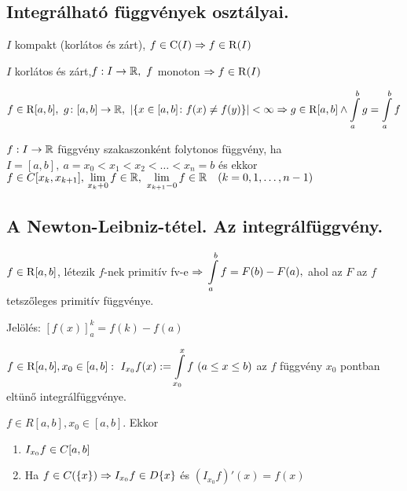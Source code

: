 \subsection{Integrálható függvények osztályai.}
\begin{te}
  $I$ kompakt (korlátos és zárt), $f\in \operatorname{C}(I)\Rightarrow f\in \operatorname{R}(I)$
\end{te}

\begin{te}
  $I$ korlátos és zárt,$f:I\to\mathbb{R},~f$ monoton $\Rightarrow f\in \operatorname{R}(I)$
\end{te}

\begin{te}
  $f\in \Rint[a,b],~ g\colon[a,b]\n\R,~ \vert\{x\in[a,b]\colon f(x)\not=f(y)\}\vert<\infty\nn\\
  g\in \Rint[a,b]\land\di\Int_a^bg=\Int_a^bf$
\end{te}

\begin{de}
  $f:I\to\mathbb{R}$ függvény szakaszonként folytonos függvény, ha \\$I=[a,b],~a=x_0<x_1<x_2<\ldots<x_n=b$ és ekkor $f\in
  C[x_k,x_{k+1}],\\
  \displaystyle\lim_{x_k+0}{f}\in\mathbb{R},~\lim_{x_{k+1}-0}{f}\in\mathbb{R}\quad(k=0,1,\ldots,n-1)$
\end{de}
\subsection{A Newton-Leibniz-tétel. Az integrálfüggvény.}
\begin{te}
  $f\in \operatorname{R}[a,b]$, létezik $f$-nek primitív fv-e $\nn\\\di\Int_a^bf=F(b)-F(a),$ ahol az $F$ az $f$ tetszőleges primitív
  függvénye.
\end{te}
\begin{megj}
  Jelölés: $[f(x)]_a^k=f(k)-f(a)$
\end{megj}
\begin{de}
  $f\in \Rint[a,b], x_0\in[a,b]:~I_{x_0}f(x):=\di\Int_{x_0}^xf~(a\le x\le b)$ az $f$ függvény $x_0$ pontban eltünő
  integrálfüggvénye.
\end{de}
\begin{te}
  $f\in R[a,b], x_0\in[a,b].$ Ekkor
  \begin{enumerate}
  \item $I_{x_0}f\in C[a,b]\\$
  \item  Ha $f\in C(\{x\})\Rightarrow I_{x_0}f\in D\{x\}$ és $(I_{x_0}f)'(x)=f(x)$
  \end{enumerate}
\end{te}

